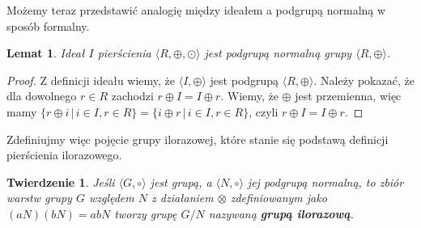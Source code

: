 \documentclass[declaration,shortabstract]{iithesis}
\theoremstyle{definition}
\theoremstyle{remark} \newtheorem{observation}{Obserwacja}
\theoremstyle{plain} \newtheorem{theorem}{Twierdzenie}
\theoremstyle{plain} \newtheorem{lemma}{Lemat}
\theoremstyle{remark} \newtheorem*{remark*}{Uwaga}
\theoremstyle{reminder} \newtheorem*{reminder*}{Przypomnienie}
\begin{document}
Możemy teraz przedstawić analogię między ideałem a podgrupą normalną w sposób formalny.

\begin{lemma}
	Ideał $I$ pierścienia $\langle R, \oplus, \odot \rangle$ jest podgrupą normalną grupy $\langle R, \oplus \rangle$.
\end{lemma}

\begin{proof}
	Z definicji ideału wiemy, że $\langle I, \oplus \rangle$ jest podgrupą $\langle R, \oplus \rangle$. \newline
	Należy pokazać, że dla dowolnego $r \in R$ zachodzi $r \oplus I = I \oplus r$. Wiemy, że $\oplus$ jest przemienna, więc mamy ${\{r \oplus i \, | \, i \in I, r \in R\}} = {\{i \oplus r \, | \, i \in I, r \in R\}}$, czyli $r \oplus I = I \oplus r$.
\end{proof}

Zdefiniujmy więc pojęcie grupy ilorazowej, które stanie się podstawą definicji pierścienia ilorazowego.

\theoremstyle{theorem}\label{grup_ilo}
\begin{theorem}
	Jeśli $\langle G, \circ \rangle$ jest grupą, a $\langle N, \circ \rangle$ jej podgrupą normalną, to zbiór warstw grupy $G$ względem $N$ z działaniem $\otimes$ zdefiniowanym jako $(aN)(bN) = abN$ tworzy grupę $G/N$ nazywaną \textbf{\textit{grupą ilorazową}}.
\end{theorem}
\end{document}
